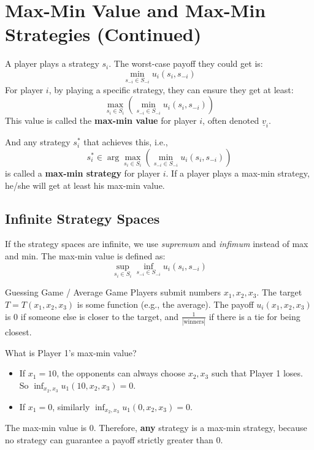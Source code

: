 \documentclass[12pt, a4paper]{article}
\begin{document}
\section{Max-Min Value and Max-Min Strategies (Continued)}

A player plays a strategy $s_i$. The worst-case payoff they could get is:
\[
  \min_{s_{-i} \in S_{-i}} u_i(s_i, s_{-i})
\]
For player $i$, by playing a specific strategy, they can ensure they get at least:
\[
  \max_{s_i \in S_i} \left( \min_{s_{-i} \in S_{-i}} u_i(s_i, s_{-i}) \right)
\]
This value is called the \textbf{max-min value} for player $i$, often denoted $\underline{v}_i$.

And any strategy $s_i^*$ that achieves this, i.e., 
\[
  s_i^* \in \arg\max_{s_i \in S_i} \left( \min_{s_{-i} \in S_{-i}} u_i(s_i, s_{-i}) \right)
\]
is called a \textbf{max-min strategy} for player $i$. If a player plays a max-min strategy, he/she will get at least his max-min value.

\subsection{Infinite Strategy Spaces}
If the strategy spaces are infinite, we use \textit{supremum} and \textit{infimum} instead of max and min. The max-min value is defined as:
\[
  \sup_{s_i \in S_i} \inf_{s_{-i} \in S_{-i}} u_i(s_i, s_{-i})
\]

\begin{exbox}{Guessing Game / Average Game}
  Players submit numbers $x_1, x_2, x_3$. The target $T = T(x_1, x_2, x_3)$ is some function (e.g., the average). 
  The payoff $u_i(x_1, x_2, x_3)$ is $0$ if someone else is closer to the target, and $\frac{1}{|\text{winners}|}$ if there is a tie for being closest.
  
  What is Player 1's max-min value?
  \begin{itemize}
      \item If $x_1 = 10$, the opponents can always choose $x_2, x_3$ such that Player 1 loses. So $\inf_{x_2, x_3} u_1(10, x_2, x_3) = 0$.
      \item If $x_1 = 0$, similarly $\inf_{x_2, x_3} u_1(0, x_2, x_3) = 0$.
  \end{itemize}
  The max-min value is $0$. Therefore, \textbf{any} strategy is a max-min strategy, because no strategy can guarantee a payoff strictly greater than $0$.
\end{exbox}
\end{document}
